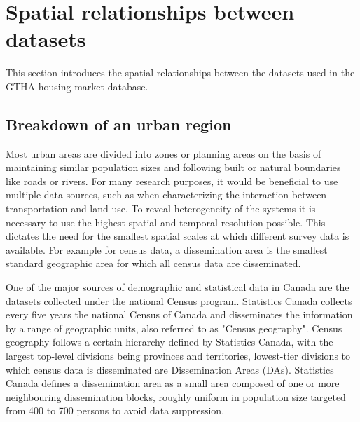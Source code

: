 
\section{Spatial relationships between datasets} \label{sec:spatial_relationships}

This section introduces the spatial relationships between the datasets used in the GTHA housing market database.

\subsection{Breakdown of an urban region} \label{subsec:breakdown_of_urban_region}

Most urban areas are divided into zones or planning areas on the basis of maintaining similar population sizes and following built or natural boundaries like roads or rivers.
For many research purposes, it would be beneficial to use multiple data sources, such as when characterizing the interaction between transportation and land use.
To reveal heterogeneity of the systems it is necessary to use the highest spatial and temporal resolution possible.
This dictates the need for the smallest spatial scales at which different survey data is available.
For example for census data, a dissemination area is the smallest standard geographic area for which all census data are disseminated.

One of the major sources of demographic and statistical data in Canada are the datasets collected under the national Census program.
Statistics Canada collects every five years the national Census of Canada and disseminates the information by a range of geographic units, also referred to as "Census geography"\cite{MapandDataLibrary2019}.
Census geography follows a certain hierarchy defined by Statistics Canada, with the largest top-level divisions being provinces and territories, lowest-tier divisions to which census data is disseminated are Dissemination Areas (DAs)\cite{StatisticsCanada2018}.
Statistics Canada defines a dissemination area as a small area composed of one or more neighbouring dissemination blocks, roughly uniform in population size targeted from 400 to 700 persons to avoid data suppression\cite{StatisticsCanada2015}.

